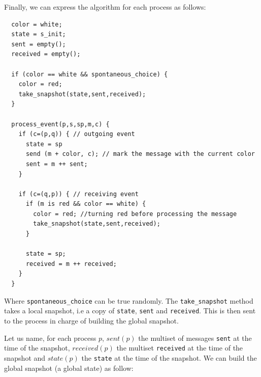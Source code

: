 \documentclass{article}
\begin{document}

    
Finally, we can express the algorithm for each process as follows:
\begin{lstlisting}
  color = white;
  state = s_init;
  sent = empty();
  received = empty();

  if (color == white && spontaneous_choice) {
    color = red;
    take_snapshot(state,sent,received);
  }

  process_event(p,s,sp,m,c) {
    if (c=(p,q)) { // outgoing event
      state = sp
      send (m + color, c); // mark the message with the current color
      sent = m ++ sent;
    }

    if (c=(q,p)) { // receiving event
      if (m is red && color == white) {
        color = red; //turning red before processing the message
        take_snapshot(state,sent,received);
      }
      
      state = sp;
      received = m ++ received;
    }
  }
\end{lstlisting}

Where \lstinline{spontaneous_choice} can be true randomly.
The \lstinline{take_snapshot} method takes a local snapshot, i.e a copy of \lstinline{state}, \lstinline{sent} and \lstinline{received}. This is then sent to the process in charge of building the global snapshot.

Let us name, for each process $p$, $\mathit{sent}(p)$ the multiset of messages \lstinline{sent} at the time of the snapshot, $\mathit{received}(p)$ the multiset \lstinline{received} at the time of the snapshot and $\mathit{state}(p)$ the \lstinline{state} at the time of the snapshot.
We can build the global snapshot (a global state) as follow:
\end{document}
